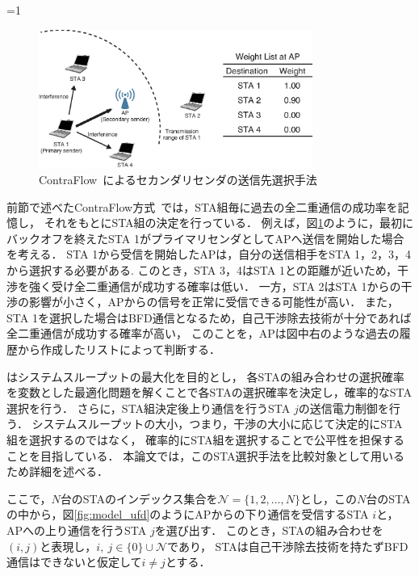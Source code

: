 \documentclass[master]{kuisthesis}		%
\newcommand{\sij}{(i,j)}
\newcommand{\mN}{{\mathcal N}}
\newcounter{flagFig}
\begin{document}
			\par
			\ifnum\value{flagFig}=1 {\begin{figure}[t]
				\begin{center}
					\includegraphics[width=0.8\textwidth]{fig/contra.eps}
					\caption{ContraFlow~\cite{contra}によるセカンダリセンダの送信先選択手法}
					\label{fig:contra}
				\end{center}
			\end{figure}}\fi
			前節で述べたContraFlow方式~\cite{contra}では，STA組毎に過去の全二重通信の成功率を記憶し，
			それをもとにSTA組の決定を行っている．
			例えば，図\ref{fig:contra}のように，最初にバックオフを終えたSTA 1がプライマリセンダとしてAPへ送信を開始した場合を考える．
			STA 1から受信を開始したAPは，自分の送信相手をSTA 1，2，3，4から選択する必要がある.
			このとき，STA 3，4はSTA 1との距離が近いため，干渉を強く受け全二重通信が成功する確率は低い．
			一方，STA 2はSTA 1からの干渉の影響が小さく，APからの信号を正常に受信できる可能性が高い．
			また，STA 1を選択した場合はBFD通信となるため，自己干渉除去技術が十分であれば全二重通信が成功する確率が高い，
			このことを，APは図中右のような過去の履歴から作成したリストによって判断する．
			\par
			\cite{promac}はシステムスループットの最大化を目的とし，
			各STAの組み合わせの選択確率を変数とした最適化問題を解くことで各STAの選択確率を決定し，確率的なSTA選択を行う．
			さらに，STA組決定後上り通信を行うSTA $j$の送信電力制御を行う．
			システムスループットの大小，つまり，干渉の大小に応じて決定的にSTA組を選択するのではなく，
			確率的にSTA組を選択することで公平性を担保することを目指している．
			本論文では，このSTA選択手法を比較対象として用いるため詳細を述べる．
			\par
			ここで，$N$台のSTAのインデックス集合を$\mN=\{1,2,...,N\}$とし，この$N$台のSTAの中から，図\ref{fig:model_ufd}のようにAPからの下り通信を受信するSTA $i$と，APへの上り通信を行うSTA $j$を選び出す．
			このとき，STAの組み合わせを$\sij$と表現し，$i,\ j \in \{0\}\cup \mN$であり，
			STAは自己干渉除去技術を持たずBFD通信はできないと仮定して$i\neq j$とする．
\end{document}

